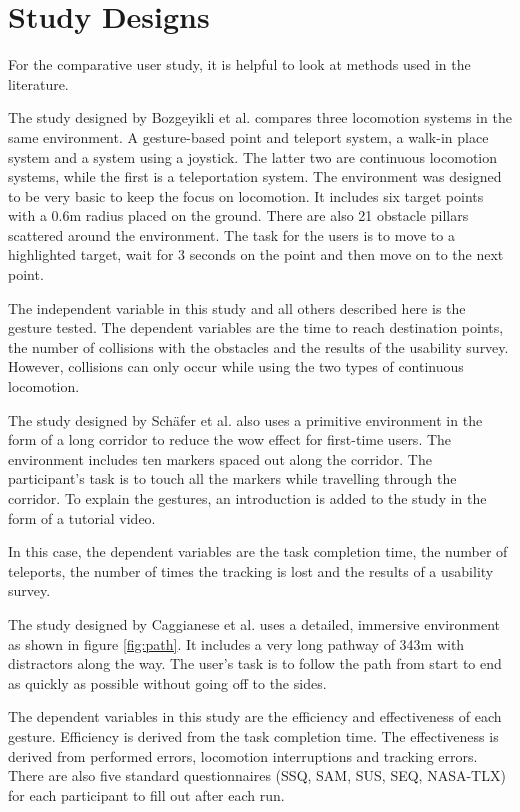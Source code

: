 \section{Study Designs}
For the comparative user study, it is helpful to look at methods used in the literature. 


The study designed by Bozgeyikli et al. \cite{bozgeyikli} compares three locomotion systems in the same environment. A gesture-based point and teleport system, a walk-in place system and a system using a joystick. The latter two are continuous locomotion systems, while the first is a teleportation system. The environment was designed to be very basic to keep the focus on locomotion. It includes six target points with a 0.6m radius placed on the ground. There are also 21 obstacle pillars scattered around the environment. The task for the users is to move to a highlighted target, wait for 3 seconds on the point and then move on to the next point.

The independent variable in this study and all others described here is the gesture tested. The dependent variables are the time to reach destination points, the number of collisions with the obstacles and the results of the usability survey. 
However, collisions can only occur while using the two types of continuous locomotion. 



The study designed by Schäfer et al. \cite{Schafer2021} also uses a primitive environment in the form of a long corridor to reduce the wow effect for first-time users. The environment includes ten markers spaced out along the corridor. The participant's task is to touch all the markers while travelling through the corridor. To explain the gestures, an introduction is added to the study in the form of a tutorial video.

In this case, the dependent variables are the task completion time, the number of teleports, the number of times the tracking is lost and the results of a usability survey.


The study designed by Caggianese et al. \cite{Caggianese} uses a detailed, immersive environment as shown in figure \ref{fig:path}. It includes a very long pathway of 343m with distractors along the way. The user's task is to follow the path from start to end as quickly as possible without going off to the sides.

The dependent variables in this study are the efficiency and effectiveness of each gesture. Efficiency is derived from the task completion time. The effectiveness is derived from performed errors, locomotion interruptions and tracking errors. There are also five standard questionnaires (SSQ, SAM, SUS, SEQ, NASA-TLX) for each participant to fill out after each run.

